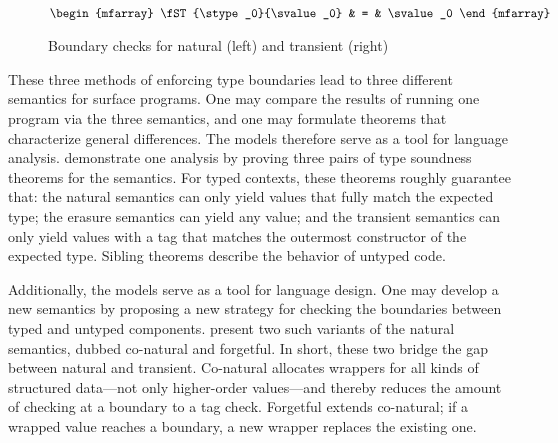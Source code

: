 \begin{figure}[ht]
\begin{minipage}[t]{0.5\columnwidth}
  \fbox{$\STsym : \tpair{\stype}{\svalue} \rightarrow \svalue \cup \serror$}\\
  \(\begin{mfarray}
    \fST{\stype_0}{\svalue_0}
    & = &
    \svalue_0
  \end{mfarray}\)
  \end{minipage}

  \caption{Boundary checks for natural (left) and transient (right)}
  \label{fig:nt-boundary}
\end{figure}

These three methods of enforcing type boundaries lead to three different
 semantics for surface programs.
One may compare the results of running one program via the three semantics,
 and one may formulate theorems that characterize general differences.
The models therefore serve as a tool for language analysis.
\citet{gf-icfp-2018} demonstrate one analysis by proving three pairs of type
 soundness theorems for the semantics.
For typed contexts, these theorems roughly guarantee that:
 the natural semantics can only yield values that fully match the expected type;
 the erasure semantics can yield any value;
 and the transient semantics can only yield values with a tag that matches
 the outermost constructor of the expected type.
Sibling theorems describe the behavior of untyped code.

Additionally, the models serve as a tool for language design.
One may develop a new semantics by proposing a new strategy for checking
 the boundaries between typed and untyped components.
\citet{gf-icfp-2018} present two such variants of the natural semantics,
 dubbed co-natural and forgetful.
In short, these two bridge the gap between natural and transient.
Co-natural allocates wrappers for all kinds of structured data---not only
 higher-order values---and thereby reduces the amount of checking at a boundary
 to a tag check.
Forgetful extends co-natural; if a wrapped value reaches a boundary, a new
 wrapper replaces the existing one.

 
%



